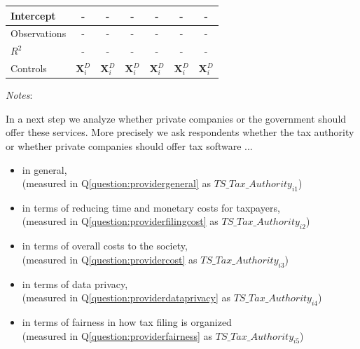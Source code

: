 \documentclass[11pt]{article}
\begin{document}
\begin{table}[!htbp]
\begin{threeparttable}
\begin{tabular}{l|cc|cc|cc}
Intercept &- &- &- &- &- &- \\
\midrule
Observations                        &-    &-    &-    &-    &-    &- \\
$R^2$                               &-    &-    &-    &-    &-    &- \\
Controls                            & $\mathbf{X}_{i}^{D}$    & $\mathbf{X}_{i}^{D}$    & $\mathbf{X}_{i}^{D}$    & $\mathbf{X}_{i}^{D}$     & $\mathbf{X}_{i}^{D}$    & $\mathbf{X}_{i}^{D}$  \\
\bottomrule
\end{tabular}
\begin{tablenotes}[flushleft]
\footnotesize
\item \textit{Notes}:   
\end{tablenotes}
\end{threeparttable}
\end{table}
\FloatBarrier

In a next step we analyze whether private companies or the government should offer these services. More precisely we ask respondents whether the tax authority or whether private companies should offer tax software ...
\begin{itemize}
    \item in general, \\(measured in Q\ref{question:providergeneral} as $TS\_Tax\_Authority_{i1}$)
    \item in terms of reducing time and monetary costs for taxpayers,\\ (measured in Q\ref{question:providerfilingcost} as $TS\_Tax\_Authority_{i2}$)
    \item in terms of overall costs to the society,\\ (measured in Q\ref{question:providercost} as $TS\_Tax\_Authority_{i3}$)
    \item in terms of data privacy,\\ (measured in Q\ref{question:providerdataprivacy} as $TS\_Tax\_Authority_{i4}$)
    \item in terms of fairness in how tax filing is organized \\ (measured in Q\ref{question:providerfairness} as $TS\_Tax\_Authority_{i5}$)
\end{itemize}
\end{document}
